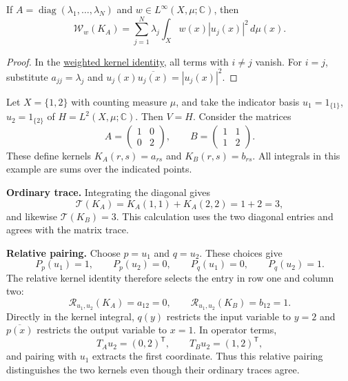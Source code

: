 \begin{corollary}\label{finite-weighted-diagonal-identity}
If $A=\operatorname{diag}(\lambda_1,\ldots,\lambda_N)$ and $w\in L^\infty(X,\mu;\mathbb C)$, then
\[
\mathcal W_w(K_A)=\sum_{j=1}^N\lambda_j\int_Xw(x)|u_j(x)|^2\,d\mu(x).
\]
\end{corollary}

\begin{proof}
In the \hyperref[finite-weighted-kernel-identity]{weighted kernel identity}, all terms with $i\ne j$ vanish. For $i=j$, substitute $a_{jj}=\lambda_j$ and $u_j(x)\overline{u_j(x)}=|u_j(x)|^2$.
\end{proof}

\label{finite-trace-information-examples}

\begin{example}\label{finite-three-measurements-example}
Let $X=\{1,2\}$ with counting measure $\mu$, and take the indicator basis $u_1=1_{\{1\}}$, $u_2=1_{\{2\}}$ of $H=L^2(X,\mu;\mathbb C)$. Then $V=H$. Consider the matrices
\[
A=\begin{pmatrix}1&0\\0&2\end{pmatrix},
\qquad B=\begin{pmatrix}1&1\\1&2\end{pmatrix}.
\]
These define kernels $K_A(r,s)=a_{rs}$ and $K_B(r,s)=b_{rs}$. All integrals in this example are sums over the indicated points.

\textbf{Ordinary trace.} Integrating the diagonal gives
\[
\mathcal T(K_A)=K_A(1,1)+K_A(2,2)=1+2=3,
\]
and likewise $\mathcal T(K_B)=3$. This calculation uses the two diagonal entries and agrees with the matrix trace.

\textbf{Relative pairing.} Choose $p=u_1$ and $q=u_2$. These choices give
\[
P_p(u_1)=1,\qquad P_p(u_2)=0,\qquad
P_q(u_1)=0,\qquad P_q(u_2)=1.
\]
The relative kernel identity therefore selects the entry in row one and column two:
\[
\mathcal R_{u_1,u_2}(K_A)=a_{12}=0,
\qquad
\mathcal R_{u_1,u_2}(K_B)=b_{12}=1.
\]
Directly in the kernel integral, $q(y)$ restricts the input variable to $y=2$ and $\overline{p(x)}$ restricts the output variable to $x=1$. In operator terms,
\[
T_Au_2=(0,2)^{\mathsf{T}},\qquad
T_Bu_2=(1,2)^{\mathsf{T}},
\]
and pairing with $u_1$ extracts the first coordinate. Thus this relative pairing distinguishes the two kernels even though their ordinary traces agree.


\end{example}
